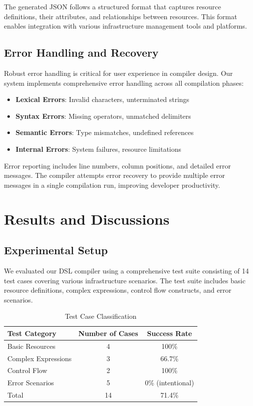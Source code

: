 \documentclass[journal,twocolumn,10pt]{IEEEtran}
\begin{document}
The generated JSON follows a structured format that captures resource definitions, their attributes, and relationships between resources. This format enables integration with various infrastructure management tools and platforms.

\subsection{Error Handling and Recovery}

Robust error handling is critical for user experience in compiler design. Our system implements comprehensive error handling across all compilation phases:

\begin{itemize}
    \item \textbf{Lexical Errors}: Invalid characters, unterminated strings
    \item \textbf{Syntax Errors}: Missing operators, unmatched delimiters
    \item \textbf{Semantic Errors}: Type mismatches, undefined references
    \item \textbf{Internal Errors}: System failures, resource limitations
\end{itemize}

Error reporting includes line numbers, column positions, and detailed error messages. The compiler attempts error recovery to provide multiple error messages in a single compilation run, improving developer productivity.

\section{Results and Discussions}
\label{sec:results}

\subsection{Experimental Setup}

We evaluated our DSL compiler using a comprehensive test suite consisting of 14 test cases covering various infrastructure scenarios. The test suite includes basic resource definitions, complex expressions, control flow constructs, and error scenarios.

\begin{table}[ht]
    \centering
    \caption{Test Case Classification}
    \label{tab:test_cases}
    \begin{tabular}{lcc}
        \toprule
        Test Category & Number of Cases & Success Rate \\
        \midrule
        Basic Resources & 4 & 100\% \\
        Complex Expressions & 3 & 66.7\% \\
        Control Flow & 2 & 100\% \\
        Error Scenarios & 5 & 0\% (intentional) \\
        \bottomrule
        Total & 14 & 71.4\% \\
    \end{tabular}
\end{table}
\end{document}
